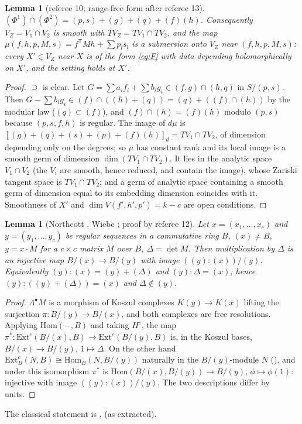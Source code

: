 \documentclass[11pt]{article}
\numberwithin{equation}{section}
\newtheorem{lemma}[theorem]{Lemma}
\theoremstyle{remark}
\newcommand{\VZ}{V_Z}
\newcommand{\T}{\mathsf{T}}
\begin{document}
\begin{lemma}[referee 10; range-free form after referee 13]\label{lem:mu}
$(\Phi^1)\cap(\Phi^2)=(p,s)+(g)+(q)+(f)(h)$. Consequently $\VZ=V_1\cap V_2$ is smooth with
$T\VZ=TV_1\cap TV_2$, and the map $\mu(f,h,p,M,s)=f^\T Mh+\sum p_ls_l$ is a submersion onto $\VZ$ near
$(f,h,p,M,s)$: every $X'\in\VZ$ near $X$ is of the form \eqref{eq:F} with data depending holomorphically on
$X'$, and the setting holds at $X'$.
\end{lemma}
\begin{proof}
$\supseteq$ is clear. Let $G=\sum a_if_i+\sum b_ig_i\in(f,g)\cap(h,q)$ in $S/(p,s)$. Then
$G-\sum b_ig_i\in(f)\cap((h)+(q))=(q)+((f)\cap(h))$ by the modular law ($(q)\subset(f)$), and
$(f)\cap(h)=(f)(h)$ modulo $(p,s)$ because $(p,s,f,h)$ is regular. The image of $d\mu$ is
$[(g)+(q)+(s)+(p)+(f)(h)]_d=TV_1\cap TV_2$, of dimension depending only on the degrees; so $\mu$ has constant
rank and its local image is a smooth germ of dimension $\dim(TV_1\cap TV_2)$. It lies in the analytic space
$V_1\cap V_2$ (the $V_i$ are smooth, hence reduced, and contain the image), whose Zariski tangent space is
$TV_1\cap TV_2$; and a germ of analytic space containing a smooth germ of dimension equal to its embedding
dimension coincides with it.
Smoothness of $X'$ and $\dim V(f',h',p')=k-c$ are open conditions.
\end{proof}

\begin{lemma}[Northcott \cite{No}, Wiebe \cite{Wi}; proof by referee 12]\label{lem:NW}
Let $x=(x_1,\dots,x_c)$ and $y=(y_1,\dots,y_c)$ be regular sequences in a commutative ring $B$, $(x)\ne B$,
$y=x\cdot M$ for a $c\times c$ matrix $M$ over $B$, $\Delta=\det M$. Then multiplication by $\Delta$ is an
injective map $B/(x)\to B/(y)$ with image $((y):(x))/(y)$. Equivalently $(y):(x)=(y)+(\Delta)$ and
$(y):\Delta=(x)$; hence $(y):((y)+(\Delta))=(x)$ and $\Delta\notin(y)$.
\end{lemma}
\begin{proof}
$\Lambda^\bullet M$ is a morphism of Koszul complexes $K(y)\to K(x)$ lifting the surjection
$\pi:B/(y)\to B/(x)$, and both complexes are free resolutions. Applying $\mathrm{Hom}(-,B)$ and taking $H^c$,
the map $\pi^*:\mathrm{Ext}^c(B/(x),B)\to\mathrm{Ext}^c(B/(y),B)$ is, in the Koszul bases, $B/(x)\to B/(y)$,
$1\mapsto\Delta$. On the other hand $\mathrm{Ext}^c_B(N,B)\cong\mathrm{Hom}_B(N,B/(y))$ naturally in the
$B/(y)$-module $N$ (\cite[Lemma~1.2.4]{BH}), and under this isomorphism $\pi^*$ is
$\mathrm{Hom}(B/(x),B/(y))\to B/(y)$, $\phi\mapsto\phi(1)$: injective with image $((y):(x))/(y)$. The two
descriptions differ by units.
\end{proof}
The classical statement is \cite[Theorem~2.5]{CPV}, \cite[Prop.~1.2]{SS} (as extracted).
\end{document}
